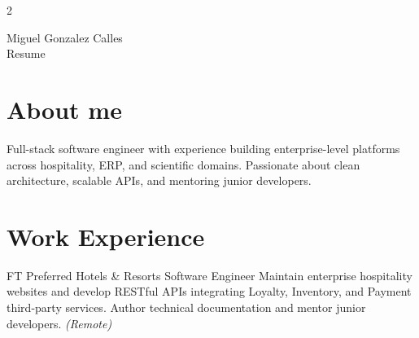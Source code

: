 \documentclass[10pt]{article} %
\begin{document}
\begin{paracol}{2} %


\parbox[top][0.12\textheight][c]{\linewidth}{ %
	\vspace{-0.04\textheight} %
	\centering %
	{\sffamily\Huge Miguel Gonzalez Calles}\\\medskip %
	{\Huge\color{headings}\cvtextfont Resume}
}


\section{About me}

Full-stack software engineer with experience building enterprise-level platforms across hospitality, ERP, and scientific domains. 
Passionate about clean architecture, scalable APIs, and mentoring junior developers.

\medskip %


\section{Work Experience}


{FT}
{Preferred Hotels \& Resorts}
{Software Engineer}
{Maintain enterprise hospitality websites and develop RESTful APIs integrating Loyalty, Inventory, and Payment third-party services. Author technical documentation and mentor junior developers. \textit{(Remote)}}


\end{paracol}
\end{document}
